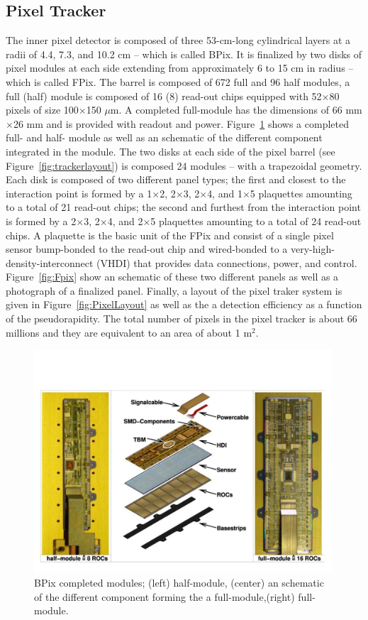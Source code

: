 \subsection{Pixel Tracker}
The inner pixel detector is composed of three 53-cm-long cylindrical layers at a
radii of 4.4, 7.3, and 10.2 cm -- which is called BPix. It is finalized by two disks of pixel
modules at each side extending from approximately 6 to 15 cm in
radius -- which is called FPix. The barrel is composed of 672 full and 96 half modules, a full (half)
module is composed of 16 (8) read-out chips equipped with 52$\times$80 pixels
of size 100$\times$150 $\mu$m. A completed full-module has the
dimensions of 66 mm$\times$26 mm and is provided with readout and
power. Figure~\ref{fig:Bpix} shows a completed full- and half- module as
well as an schematic of the different component integrated in the
module. The two disks at each side of the pixel barrel (see
Figure~\ref{fig:trackerlayout}) is composed 24 modules -- with a
trapezoidal geometry. Each disk is composed of two different
panel types; the first and closest to the interaction point is formed
by a 1$\times$2, 2$\times$3, 2$\times$4, and 1$\times$5 plaquettes
amounting to a total of 21 read-out chips; the second and furthest from
the interaction point is formed by a 2$\times$3, 2$\times$4, and 2$\times$5 plaquettes
amounting to a total of 24 read-out chips. A plaquette is the basic
unit of the FPix and consist of a single pixel sensor bump-bonded to
the read-out chip and wired-bonded to a very-high-density-interconnect
(VHDI) that provides data connections, power, and
control. Figure~\ref{fig:Fpix} show an schematic of these two
different panels as well as a photograph of a finalized
panel. Finally, a layout of the pixel traker system is given in
Figure~\ref{fig:PixelLayout} as well as the a detection efficiency as
a function of the pseudorapidity. The total number of pixels in the
pixel tracker is about 66 millions and they are equivalent to an area
of about 1 m$^2$.
\begin{figure}
 \centering
\includegraphics[width=0.99\textwidth]{CMS_DetectorFigures/BPixModule.pdf}
 \caption{BPix completed modules; (left) half-module, (center) an
   schematic of the different component forming the a full-module,(right) full-module.\label{fig:Bpix}}
\end{figure}
